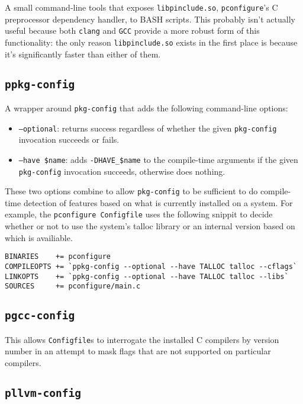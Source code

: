 \documentclass{article}
\newcommand{\pconfigure}{\texttt{pconfigure}}
\begin{document}
A small command-line tools that exposes \texttt{libpinclude.so},
\pconfigure's C preprocessor dependency handler, to BASH scripts.
This probably isn't actually useful because both \texttt{clang} and
\texttt{GCC} provide a more robust form of this functionality: the
only reason \texttt{libpinclude.so} exists in the first place is
because it's significantly faster than either of them.

\subsection{\texttt{ppkg-config}}

A wrapper around \texttt{pkg-config} that adds the following
command-line options:

\begin{itemize}
\item \texttt{--optional}: returns success regardless of whether the
  given \texttt{pkg-config} invocation succeeds or fails.
\item \texttt{--have \$name}: adds \texttt{-DHAVE\_\$name} to the
  compile-time arguments if the given \texttt{pkg-config} invocation
  succeeds, otherwise does nothing.
\end{itemize}

These two options combine to allow \texttt{pkg-config} to be
sufficient to do compile-time detection of features based on what is
currently installed on a system.  For example, the
\pconfigure\ \texttt{Configfile} uses the following snippit to decide
whether or not to use the system's talloc library or an internal
version based on which is availiable.

\begin{verbatim}
BINARIES    += pconfigure
COMPILEOPTS += `ppkg-config --optional --have TALLOC talloc --cflags`
LINKOPTS    += `ppkg-config --optional --have TALLOC talloc --libs`
SOURCES     += pconfigure/main.c
\end{verbatim}

\subsection{\texttt{pgcc-config}}

This allows \texttt{Configfile}s to interrogate the installed C
compilers by version number in an attempt to mask flags that are not
supported on particular compilers.

\subsection{\texttt{pllvm-config}}
\end{document}
